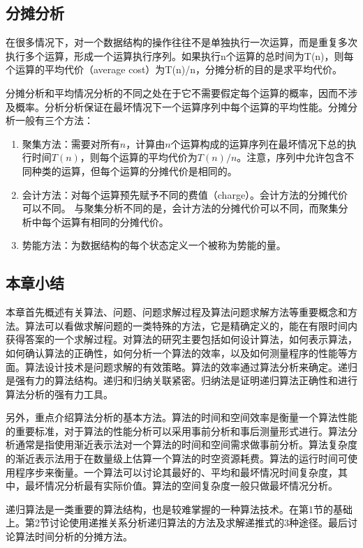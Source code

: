 \subsection*{分摊分析} 
在很多情况下，对一个数据结构的操作往往不是单独执行一次运算，而是重复多次执行多个运算，形成一个运算执行序列。如果执行n个运算的总时间为T(n)，则每个运算的平均代价（average cost）为T(n)/n，分摊分析的目的是求平均代价。

分摊分析和平均情况分析的不同之处在于它不需要假定每个运算的概率，因而不涉及概率。分析分析保证在最坏情况下一个运算序列中每个运算的平均性能。分摊分析一般有三个方法：
\begin{enumerate}
	\item 聚集方法：需要对所有$n$，计算由$n$个运算构成的运算序列在最坏情况下总的执行时间$T(n)$，则每个运算的平均代价为$T(n)/n$。注意，序列中允许包含不同种类的运算，但每个运算的分摊代价是相同的。
	\item 会计方法：对每个运算预先赋予不同的费值（charge）。会计方法的分摊代价可以不同。 与聚集分析不同的是，会计方法的分摊代价可以不同，而聚集分析中每个运算有相同的分摊代价。
	\item 势能方法：为数据结构的每个状态定义一个被称为势能的量。
\end{enumerate}

\subsection*{本章小结}
本章首先概述有关算法、问题、问题求解过程及算法问题求解方法等重要概念和方法。算法可以看做求解问题的一类特殊的方法，它是精确定义的，能在有限时间内获得答案的一个求解过程。对算法的研究主要包括如何设计算法，如何表示算法，如何确认算法的正确性，如何分析一个算法的效率，以及如何测量程序的性能等方面。算法设计技术是问题求解的有效策略。算法的效率通过算法分析来确定。递归是强有力的算法结构。递归和归纳关联紧密。归纳法是证明递归算法正确性和进行算法分析的强有力工具。

另外，重点介绍算法分析的基本方法。算法的时间和空间效率是衡量一个算法性能的重要标准，对于算法的性能分析可以采用事前分析和事后测量形式进行。算法分析通常是指使用渐近表示法对一个算法的时间和空间需求做事前分析。算法复杂度的渐近表示法用于在数量级上估算一个算法的时空资源耗费。算法的运行时间可使用程序步来衡量。一个算法可以讨论其最好的、平均和最坏情况时间复杂度，其中，最坏情况分析最有实际价值。算法的空间复杂度一般只做最坏情况分析。

递归算法是一类重要的算法结构，也是较难掌握的一种算法技术。在第1节的基础上。第2节讨论使用递推关系分析递归算法的方法及求解递推式的3种途径。最后讨论算法时间分析的分摊方法。
